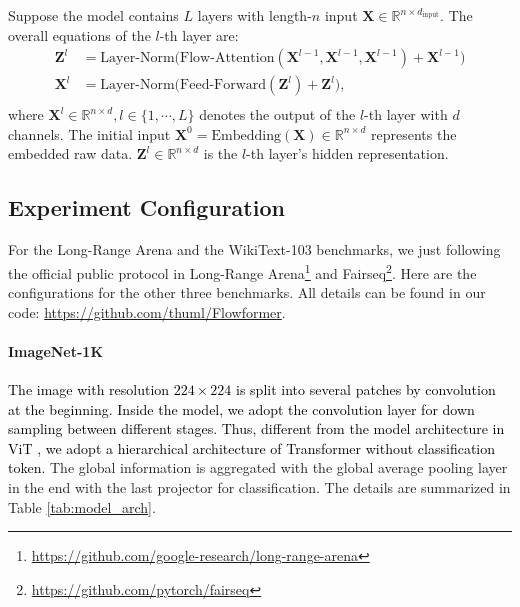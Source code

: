 \documentclass[nohyperref]{article}
\theoremstyle{plain}
\theoremstyle{definition}
\theoremstyle{remark}
\newcommand{\update}[1]{{\textcolor{black}{#1}}}
\begin{document}
Suppose the model contains $L$ layers with length-$n$ input $\mathbf{X}\in\mathbb{R}^{n\times d_{\text{input}}}$. The overall equations of the $l$-th layer are:
\begin{equation}\label{equ:overall_equation}
  \begin{split}
    \mathbf{Z}^{l}&=\mathrm{Layer}\text{-}\mathrm{Norm}\Big(\mathrm{Flow}\text{-}\mathrm{Attention}(\mathbf{X}^{l-1},\mathbf{X}^{l-1},\mathbf{X}^{l-1})+\mathbf{X}^{l-1}\Big) \\
    \mathbf{X}^{l}&=\mathrm{Layer}\text{-}\mathrm{Norm}\Big(\mathrm{Feed}\text{-}\mathrm{Forward}(\mathbf{Z}^{l})+\mathbf{Z}^{l}\Big), \\
  \end{split}
\end{equation}
where $\mathbf{X}^{l}\in\mathbb{R}^{n\times d}, l\in\{1,\cdots,L\}$ denotes the output of the $l$-th layer with $d$ channels. The initial input $\mathbf{X}^{0}=\mathrm{Embedding}(\mathbf{X})\in\mathbb{R}^{n\times d}$ represents the embedded raw data. $\mathbf{Z}^{l}\in\mathbb{R}^{n\times d}$ is the $l$-th layer's hidden representation.


\subsection{Experiment Configuration} \label{appendix:exp_details}

For the Long-Range Arena \cite{Tay2021LongRA} and the WikiText-103 \cite{Merity2017PointerSM} benchmarks, we just following the official public protocol in Long-Range Arena\footnote{\url{https://github.com/google-research/long-range-arena}} and Fairseq\footnote{\url{https://github.com/pytorch/fairseq}}. Here are the configurations for the other three benchmarks. All details can be found in our code: \href{https://github.com/thuml/Flowformer}{https://github.com/thuml/Flowformer}.

\paragraph{ImageNet-1K} 
\update{The image with resolution $224\times 224$ is split into several patches by convolution at the beginning. Inside the model, we adopt the convolution layer for down sampling between different stages. Thus, different from the model architecture in ViT \cite{dosovitskiy2021an}, we adopt a hierarchical architecture of Transformer without classification token.} The global information is aggregated with the global average pooling layer in the end with the last projector for classification. The details are summarized in Table \ref{tab:model_arch}.
\end{document}
